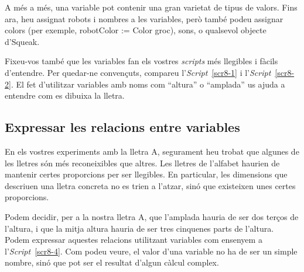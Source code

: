 A més a més, una variable pot contenir una gran varietat de tipus de valors. Fins ara, heu assignat robots i nombres a les variables, però també podeu assignar colors (per exemple, \textsf{robotColor := Color groc}), sons, o qualsevol objecte d'Squeak.

Fixeu-vos també que les variables fan els vostres \emph{scripts} més llegibles i fàcils d'entendre. Per quedar-ne convençuts, compareu l'\emph{Script}~\ref{scr8-1} i l'\emph{Script}~\ref{scr8-2}. El fet d'utilitzar variables amb noms com ``altura'' o ``amplada'' us ajuda a entendre com es dibuixa la lletra. 

\subsection{Expressar les relacions entre variables}
En els vostres experiments amb la lletra A, segurament heu trobat que algunes de les lletres són més reconeixibles que altres. Les lletres de l'alfabet haurien de mantenir certes proporcions per ser llegibles. En particular, les dimensions que descriuen una lletra concreta no es trien a l'atzar, sinó que existeixen unes certes proporcions.

Podem decidir, per a la nostra lletra A, que l'amplada hauria de ser dos terços de l'altura, i que la mitja altura hauria de ser tres cinquenes parts de l'altura. Podem expressar aquestes relacions utilitzant variables com ensenyem a l'\emph{Script}~\ref{scr8-4}. Com podeu veure, el valor d'una variable no ha de ser un simple nombre, sinó que pot ser el resultat d'algun càlcul complex.

